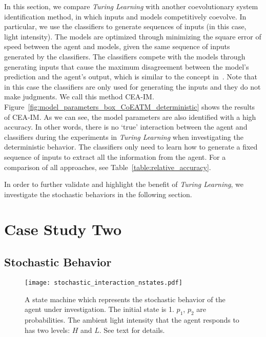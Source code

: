 In this section, we compare \textit{Turing Learning} with another coevolutionary system identification method, in which inputs and models competitively coevolve. In particular, we use the classifiers to generate sequences of inputs (in this case, light intensity). The models are optimized through minimizing the square error of speed between the agent and models, given the same sequence of inputs generated by the classifiers. The classifiers compete with the models through generating inputs that cause the maximum disagreement between the model's prediction and the agent's output, which is similar to the concept in~\cite{Bongard2005_tevc}. Note that in this case the classifiers are only used for generating the inputs and they do not make judgments. We call this method CEA-IM. Figure~\ref{fig:model_parameters_box_CoEATM_deterministic} shows the results of CEA-IM. As we can see, the model parameters are also identified with a high accuracy. In other words, there is no `true' interaction between the agent and classifiers during the experiments in \textit{Turing Learning} when investigating the deterministic behavior. The classifiers only need to learn how to generate a fixed sequence of inputs to extract all the information from the agent. For a comparison of all approaches, see Table~\ref{table:relative_accuracy}. 

In order to further validate and highlight the benefit of \textit{Turing Learning}, we investigate the stochastic behaviors in the following section. 

\section{Case Study Two}\label{sec:case_study_two_stochastic_interaction}

\subsection{Stochastic Behavior}\label{sec:stochastic_behavior_interaction}

\begin{figure}[!t]
\centering
\texttt{[image: stochastic\_interaction\_nstates.pdf]}
\caption{A state machine which represents the stochastic behavior of the agent under investigation. The initial state is 1. $p_1$, $p_2$ are probabilities. The ambient light intensity that the agent responds to has two levels: $H$ and $L$. See text for details.}
\label{fig:stochastic_behavior_n_states} 
\end{figure}

